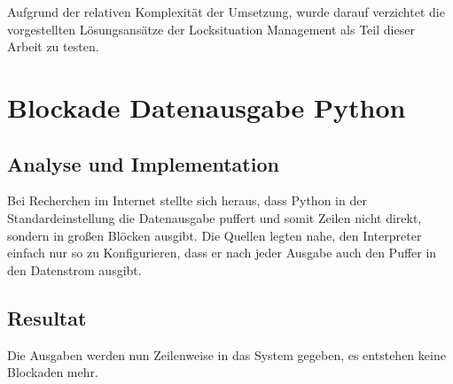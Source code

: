 Aufgrund der relativen Komplexität der Umsetzung,
wurde darauf verzichtet die vorgestellten Lösungsansätze der Locksituation Management
als Teil dieser Arbeit zu testen.

\section{Blockade Datenausgabe Python}
\subsection{Analyse und Implementation}

Bei Recherchen im Internet stellte sich heraus,
dass Python in der Standardeinstellung die Datenausgabe puffert und somit Zeilen nicht direkt,
sondern in großen Blöcken ausgibt.
Die Quellen legten nahe, den Interpreter einfach nur so zu Konfigurieren,
dass er nach jeder Ausgabe auch den Puffer in den Datenstrom ausgibt.

\subsection{Resultat}

Die Ausgaben werden nun Zeilenweise in das System gegeben,
es entstehen keine Blockaden mehr.